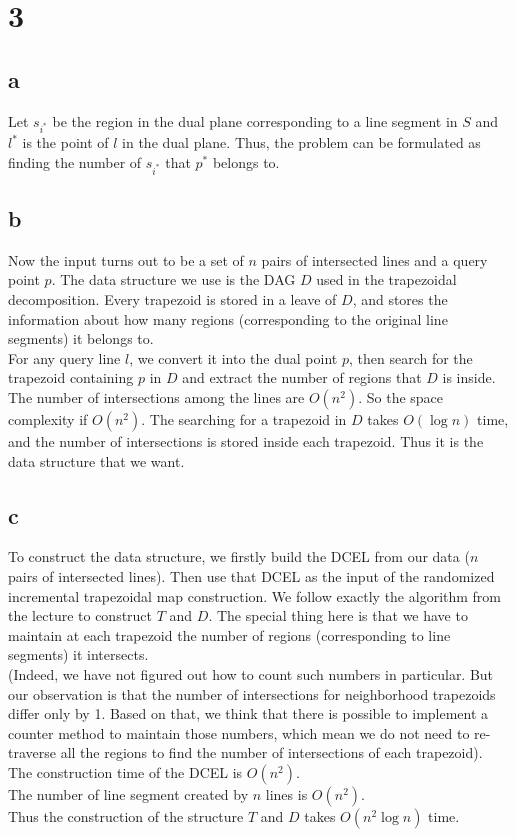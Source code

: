 \section*{3}
\subsection*{a}
Let $s_{i^*}$ be the region in the dual plane corresponding to a line segment in $S$ and $l^*$ is the point
of $l$ in the dual plane.  Thus, the problem can be formulated as finding the number
of $s_{i^*}$ that $p^*$ belongs to.

\subsection*{b}
Now the input turns out to be a set of $n$ pairs of intersected lines and a query point $p$. The data structure we use is the DAG $D$ used in the trapezoidal 
decomposition. Every trapezoid is stored in a leave of $D$, and stores the information about how many regions (corresponding to the original line segments) it belongs to. \\

For any query line $l$, we convert it into the dual point $p$, then search for the trapezoid containing $p$ in $D$ and extract the number of regions that $D$ is inside. \\

The number of intersections among the lines are $O(n^2)$. So the space complexity if $O(n^2)$. The searching for a trapezoid in $D$ takes $O(\log n)$ time, and the number of intersections is stored inside each trapezoid. Thus it is the data structure that we want. \\
\subsection*{c}
To construct the data structure, we firstly build the DCEL from our data ($n$ pairs of intersected lines). Then use that DCEL as the input of the randomized incremental trapezoidal map construction. We follow exactly the algorithm from the lecture to construct $T$ and $D$. The special thing here is that we have to maintain at each trapezoid the number of regions (corresponding to line segments) it intersects. \\

(Indeed, we have not figured out how to count such numbers in particular. But our observation is that the number of intersections for neighborhood trapezoids differ only by 1. Based on that, we think that there is possible to implement a counter method to maintain those numbers, which mean we do not need to re-traverse all the regions to find the number of intersections of each trapezoid). \\

The construction time of the DCEL is $O(n^2)$. \\

The number of line segment created by $n$ lines is $O(n^2)$. \\

Thus the construction of the structure $T$ and $D$ takes $O(n^2 \log n)$ time. \\

